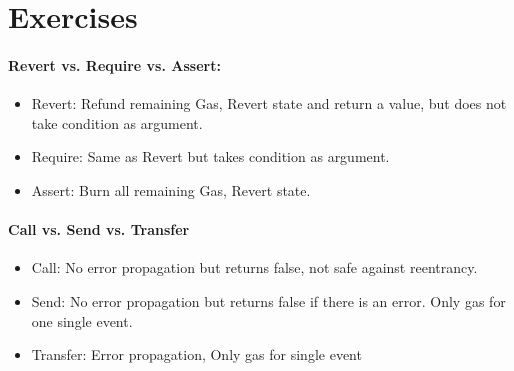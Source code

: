 \section{Exercises}

\paragraph{Revert vs. Require vs. Assert: }
\begin{itemize}
    \item Revert: Refund remaining Gas, Revert state and return a value, but does not take condition as argument.
    \item Require: Same as Revert but takes condition as argument.
    \item Assert: Burn all remaining Gas, Revert state.
\end{itemize}

\paragraph{Call vs. Send vs. Transfer}
\begin{itemize}
    \item Call: No error propagation but returns false, not safe against reentrancy. 
    \item Send: No error propagation but returns false if there is an error. Only gas for one single event.
    \item Transfer: Error propagation, Only gas for single event
\end{itemize}